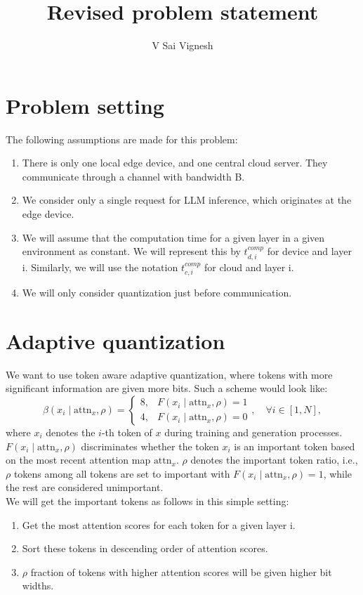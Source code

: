 \documentclass{article}
\title{Revised problem statement}
\author{V Sai Vignesh}
\date{\displaydate{Meet 4}}
\begin{document}
\maketitle

\section{Problem setting}
The following assumptions are made for this problem:
\begin{enumerate}
    \item There is only one local edge device, and one central cloud server. They communicate through a channel with bandwidth B. 
    \item We consider only a single request for LLM inference, which originates at the edge device. 
    \item We will assume that the computation time for a given layer in a given environment as constant. We will represent this by $t^{comp}_{d, i}$ for device and layer i. Similarly, we will use the notation $t^{comp}_{c, i}$ for cloud and layer i.
    \item We will only consider quantization just before communication. 
\end{enumerate}
\section{Adaptive quantization}
We want to use token aware adaptive quantization, where tokens with more significant information are given more bits. Such a scheme would look like:
\[
\beta(x_i \mid \text{attn}_x, \rho) =
\begin{cases} 
8, & F(x_i \mid \text{attn}_x, \rho) = 1 \\
4, & F(x_i \mid \text{attn}_x, \rho) = 0
\end{cases}, \quad \forall i \in [1, N],
\]
where \(x_i\) denotes the \(i\)-th token of \(x\) during training and generation processes. \(F(x_i \mid \text{attn}_x, \rho)\) discriminates whether the token \(x_i\) is an important token based on the most recent attention map \(\text{attn}_x\). \(\rho\) denotes the important token ratio, i.e., \(\rho\) tokens among all tokens are set to important with \(F(x_i \mid \text{attn}_x, \rho) = 1\), while the rest are considered unimportant.\\
We will get the important tokens as follows in this simple setting:
\begin{enumerate}
    \item Get the most attention scores for each token for a given layer i.
    \item Sort these tokens in descending order of attention scores. 
    \item $ \rho $ fraction of tokens with higher attention scores will be given higher bit widths. 
\end{enumerate}
\end{document}

